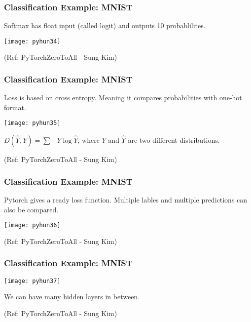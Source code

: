 \begin{frame}[fragile] \frametitle{Classification Example: MNIST}
Softmax has float input (called logit) and outputs 10 probablilites.

\begin{center}
\texttt{[image: pyhun34]}
\end{center}


\tiny{(Ref: PyTorchZeroToAll  - Sung Kim)}
\end{frame}

\begin{frame}[fragile] \frametitle{Classification Example: MNIST}
Loss is based on cross entropy. Meaning it compares probabilities with one-hot format.

\begin{center}
\texttt{[image: pyhun35]}
\end{center}

$D(\hat{Y},Y) = \sum -Y \log \hat{Y}$, where $Y$ and $\hat{Y}$ are two different distributions.

\tiny{(Ref: PyTorchZeroToAll  - Sung Kim)}
\end{frame}

\begin{frame}[fragile] \frametitle{Classification Example: MNIST}
Pytorch gives a ready loss function. Multiple lables and multiple predictions can also be compared.

\begin{center}
\texttt{[image: pyhun36]}
\end{center}

\tiny{(Ref: PyTorchZeroToAll  - Sung Kim)}
\end{frame}

\begin{frame}[fragile] \frametitle{Classification Example: MNIST}
\begin{center}
\texttt{[image: pyhun37]}
\end{center}

We can have many hidden layers in between.

\tiny{(Ref: PyTorchZeroToAll  - Sung Kim)}
\end{frame}

